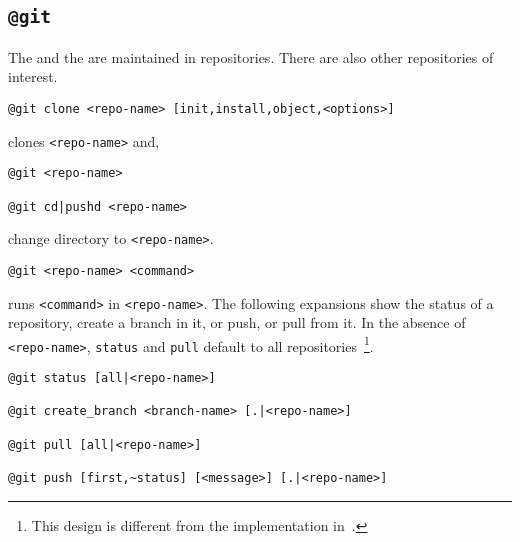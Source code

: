 \subsection{\texttt{@git}}
\label{git}

The  and the  are maintained in repositories. There are also other repositories of interest.
%
\begin{verbatim}
@git clone <repo-name> [init,install,object,<options>]
\end{verbatim}
%
clones \texttt{<repo-name>} and,
%
\begin{verbatim}
@git <repo-name>

@git cd|pushd <repo-name>
\end{verbatim}
%
change directory to \texttt{<repo-name>}.
%
\begin{verbatim}
@git <repo-name> <command>
\end{verbatim}
%
runs \texttt{<command>} in \texttt{<repo-name>}. The following expansions show the status of a repository, create a branch in it, or push, or pull from it. In the absence of \texttt{<repo-name>}, \texttt{status} and \texttt{pull} default to all repositories~\footnote{This design is different from the implementation in~.}.
%
\begin{verbatim}
@git status [all|<repo-name>]

@git create_branch <branch-name> [.|<repo-name>]

@git pull [all|<repo-name>]

@git push [first,~status] [<message>] [.|<repo-name>]
\end{verbatim}